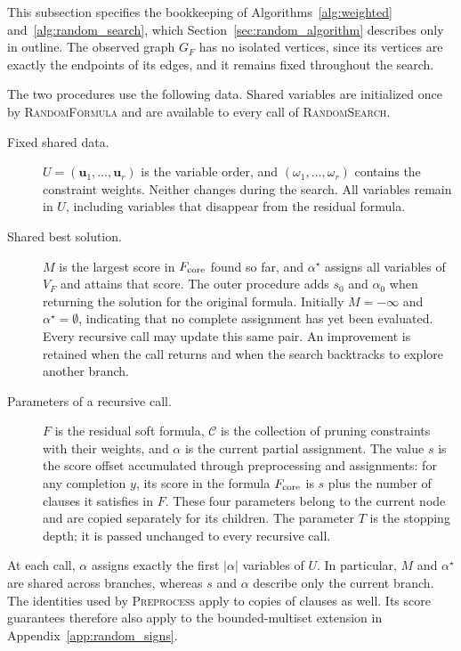 \documentclass[11pt,a4paper]{article}
\theoremstyle{definition}
\theoremstyle{remark}
\begin{document}
This subsection specifies the bookkeeping of
Algorithms~\ref{alg:weighted} and~\ref{alg:random_search}, which
Section~\ref{sec:random_algorithm} describes only in outline.
The observed graph $G_F$ has no isolated vertices, since its vertices are
exactly the endpoints of its edges, and it remains fixed throughout the
search.

The two procedures use the following data. Shared variables are initialized
once by \textnormal{\textsc{RandomFormula}} and are available to every call
of \textnormal{\textsc{RandomSearch}}.
\begin{description}
\item[Fixed shared data.]
$U=(\mathbf u_1,\ldots,\mathbf u_r)$ is the variable order, and
$(\omega_1,\ldots,\omega_r)$ contains the constraint weights.
Neither changes during the search. All variables remain in $U$, including
variables that disappear from the residual formula.
\item[Shared best solution.]
$M$ is the largest score in $F_{\rm core}$ found so far, and
$\alpha^\star$ assigns all variables of $V_F$ and attains that score.
The outer procedure adds $s_0$ and $\alpha_0$ when returning the solution
for the original formula. Initially
$M=-\infty$ and $\alpha^\star=\emptyset$, indicating that no complete
assignment has yet been evaluated. Every recursive call may update this
same pair. An improvement is retained when the call returns and when
the search backtracks to explore another branch.
\item[Parameters of a recursive call.]
$F$ is the residual soft formula, $\mathcal C$ is the collection of
pruning constraints with their weights, and $\alpha$ is the current
partial assignment. The value $s$ is the score offset accumulated through
preprocessing and assignments: for any completion $y$, its score in
the formula $F_{\rm core}$ is $s$ plus the number of clauses it satisfies in
$F$. These four parameters belong to the current node and are copied
separately for its children. The parameter $T$ is the stopping depth;
it is passed unchanged to every recursive call.
\end{description}
At each call, $\alpha$ assigns exactly the first $|\alpha|$ variables of
$U$. In particular, $M$ and $\alpha^\star$ are shared across branches,
whereas $s$ and $\alpha$ describe only the current branch.
The identities used by \textnormal{\textsc{Preprocess}} apply to copies
of clauses as well. Its score guarantees therefore also apply to the
bounded-multiset extension in Appendix~\ref{app:random_signs}.
\end{document}
